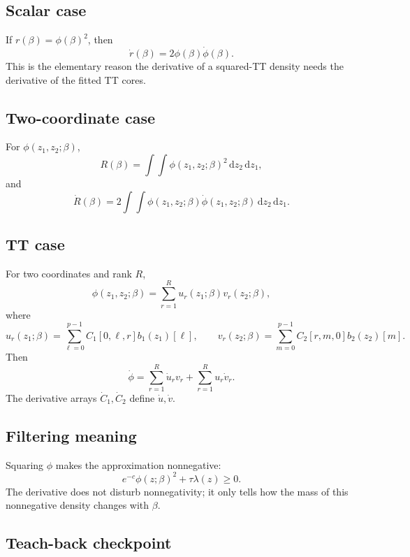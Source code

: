 \documentclass[11pt]{article}
\newcommand{\dd}{\,\mathrm d}
\begin{document}
\subsection*{Scalar case}

If \(r(\beta)=\phi(\beta)^2\), then
\[
    \dot r(\beta)=2\phi(\beta)\dot\phi(\beta).
    \tag{P21-24}
\]
This is the elementary reason the derivative of a squared-TT density needs the
derivative of the fitted TT cores.

\subsection*{Two-coordinate case}

For \(\phi(z_1,z_2;\beta)\),
\[
    R(\beta)=
    \int\!\!\int \phi(z_1,z_2;\beta)^2\dd z_2\dd z_1,
    \tag{P21-25}
\]
and
\[
    \dot R(\beta)=
    2\int\!\!\int
    \phi(z_1,z_2;\beta)\dot\phi(z_1,z_2;\beta)
    \dd z_2\dd z_1.
    \tag{P21-26}
\]

\subsection*{TT case}

For two coordinates and rank \(R\),
\[
    \phi(z_1,z_2;\beta)
    =
    \sum_{r=1}^{R}
    u_r(z_1;\beta)v_r(z_2;\beta),
    \tag{P21-27}
\]
where
\[
    u_r(z_1;\beta)=\sum_{\ell=0}^{p-1}C_1[0,\ell,r]b_1(z_1)[\ell],
    \qquad
    v_r(z_2;\beta)=\sum_{m=0}^{p-1}C_2[r,m,0]b_2(z_2)[m].
    \tag{P21-28}
\]
Then
\[
    \dot\phi
    =
    \sum_{r=1}^{R}
    \dot u_r v_r
    +
    \sum_{r=1}^{R}
    u_r\dot v_r.
    \tag{P21-29}
\]
The derivative arrays \(\dot C_1,\dot C_2\) define \(\dot u,\dot v\).

\subsection*{Filtering meaning}

Squaring \(\phi\) makes the approximation nonnegative:
\[
    e^{-c}\phi(z;\beta)^2+\tau\lambda(z)\ge0.
    \tag{P21-30}
\]
The derivative does not disturb nonnegativity; it only tells how the mass of
this nonnegative density changes with \(\beta\).

\subsection*{Teach-back checkpoint}
\end{document}
